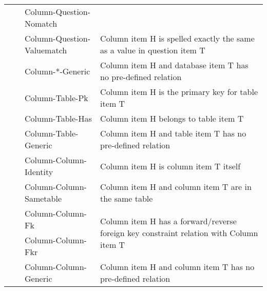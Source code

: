 \documentclass[11pt]{article}
\begin{document}
\begin{table*}
{\begin{tabular}{llll}
                        &                     & Column-Question-Nomatch      &                                                                                    \\\cmidrule{3-4} 
                        &                     & Column-Question-Valuematch   &    Column item H is spelled exactly the same as a value in question item T                                                                                  \\ \midrule
                     &                  & Column-*-Generic             & Column item H and database item T has no pre-defined relation                                                           \\ \midrule
    \multirow{3}{*}{}  & \multirow{3}{*}{}  & Column-Table-Pk              & Column item H is the primary key for table item T                               \\
                        &                     & Column-Table-Has             &      Column item H belongs to table item T                                                                               \\
                        &                     & Column-Table-Generic         &         Column item H and table item T has no pre-defined relation                                                                           \\ \midrule
    \multirow{5}{*}{}  & \multirow{5}{*}{}  & Column-Column-Identity       & Column item H is column item T itself                                                            \\ \cmidrule{3-4} 
                        &                     & Column-Column-Sametable      & Column item H and column item T are in the  same table                                                              \\ \cmidrule{3-4} 
                        &                     & Column-Column-Fk             & \multirow{2}{*}{Column item H has a forward/reverse foreign key constraint relation with Column item T}                                              \\
                        &                     & Column-Column-Fkr            &                                                                                    \\ \cmidrule{3-4} 
                        &                     & Column-Column-Generic        & Column item H and column item T has no pre-defined relation                      \\ \midrule

\end{tabular}}
\end{table*}
\end{document}
